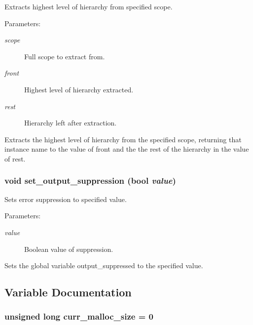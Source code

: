 Extracts highest level of hierarchy from specified scope.

\begin{Desc}
\item[Parameters: ]\par
\begin{description}
\item[{\em 
scope}]Full scope to extract from. \item[{\em 
front}]Highest level of hierarchy extracted. \item[{\em 
rest}]Hierarchy left after extraction.\end{description}
\end{Desc}
Extracts the highest level of hierarchy from the specified scope, returning that instance name to the value of front and the the rest of the hierarchy in the value of rest. 
\subsubsection{\setlength{\rightskip}{0pt plus 5cm}void set\_\-output\_\-suppression ({\bf bool} {\em value})}\label{util_8c_a3}


Sets error suppression to specified value.

\begin{Desc}
\item[Parameters: ]\par
\begin{description}
\item[{\em 
value}]Boolean value of suppression.\end{description}
\end{Desc}
Sets the global variable output\_\-suppressed to the specified value. 

\subsection{Variable Documentation}
\subsubsection{\setlength{\rightskip}{0pt plus 5cm}unsigned long curr\_\-malloc\_\-size = 0}\label{util_8c_a1}


